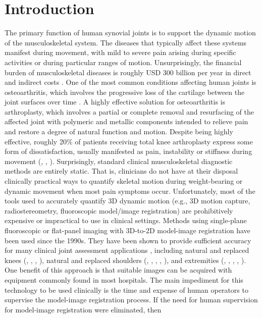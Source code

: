 \chapter{Introduction}

The primary function of human synovial joints is to support the dynamic motion of the musculoskeletal system. The diseases that typically affect these systems manifest during movement, with mild to severe pain arising during specific activities or during particular ranges of motion. Unsurprisingly, the financial burden of musculoskeletal diseases is roughly USD 300 billion per year in direct and indirect costs \cite{BMUSBurdenMusculoskeletal}. One of the most common conditions affecting human joints is osteoarthritis, which involves the progressive loss of the cartilage between the joint surfaces over time \cite{sharmaOsteoarthritisCompanionRheumatology2007}. A highly effective solution for osteoarthritis is arthroplasty, which involves a partial or complete removal and resurfacing of the affected joint with polymeric and metallic components intended to relieve pain and restore a degree of natural function and motion. Despite being highly effective, roughly 20\% of patients receiving total knee arthroplasty express some form of dissatisfaction, usually manifested as pain, instability or stiffness during movement (\cite{bakerRolePainFunction2007}, \cite{scottPredictingDissatisfactionFollowing2010}, \cite{bournePatientSatisfactionTotal2010}). Surprisingly, standard clinical musculoskeletal diagnostic methods are entirely static. That is, clinicians do not have at their disposal clinically practical ways to quantify skeletal motion during weight-bearing or dynamic movement when most pain symptoms occur. Unfortunately, most of the tools used to accurately quantify 3D dynamic motion (e.g., 3D motion capture, radiostereometry, fluoroscopic model/image registration) are prohibitively expensive or impractical to use in clinical settings. Methods using single-plane fluoroscopic or flat-panel imaging with 3D-to-2D model-image registration have been used since the 1990s. They have been shown to provide sufficient accuracy for many clinical  joint assessment applications , including natural and replaced knees (\cite{banksAccurateMeasurementThreedimensional1996}, \cite{banksVivoKinematicsCruciateretaining1997}, \cite{mahfouzRobustMethodRegistration2003}, \cite{zuffiModelbasedMethodReconstruction1999}), natural and replaced shoulders (\cite{matsukiVivo3DAnalysis2014}, \cite{matsukiDynamicVivoGlenohumeral2012}, \cite{zhuAccuracyRepeatabilityAutomatic2012}, \cite{matsukiVivo3dimensionalAnalysis2011}, \cite{kijimaVivo3dimensionalAnalysis2015}), and extremities (\cite{yamaguchiAnkleSubtalarKinematics2009}, \cite{listThreeDimensionalKinematicsUnconstrained2012}, \cite{cenniKinematicsThreeComponents2012}, \cite{cenniFunctionalPerformanceTotal2013}, \cite{tersi3DElbowKinematics2009}). One benefit of this approach is that suitable images can be acquired with equipment commonly found in most hospitals. The main impediment for this technology to be used clinically is the time and expense of human operators to supervise the model-image registration process. If the need for human supervision for model-image registration were eliminated, then 